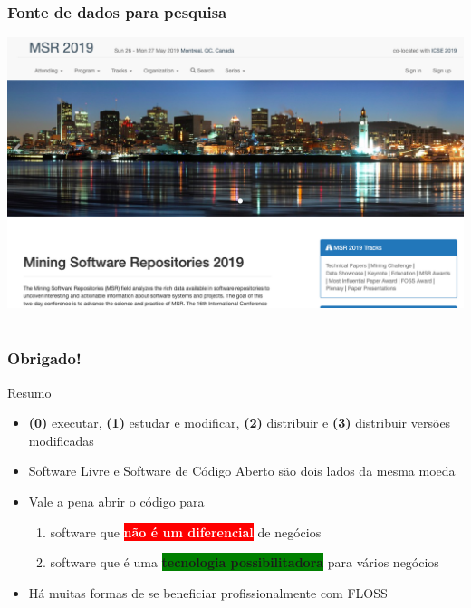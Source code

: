 \documentclass[xcolor=dvipsnames]{beamer}
\newcommand{\bred}[1]{\colorbox{red}{\textcolor{white}{#1}}}
\newcommand{\bgreen}[1]{\colorbox{green}{#1}}
\begin{document}
\begin{frame}
	\frametitle{Fonte de dados para pesquisa}
 	\includegraphics[scale=0.24]{msr.png}
\end{frame}


\section{}

\begin{frame}
	\frametitle{Obrigado!}
\begin{block}{Resumo}
\begin{itemize}
\item {\bf (0)} executar, {\bf (1)} estudar e modificar, {\bf (2)} distribuir e {\bf (3)} distribuir versões modificadas
\item Software Livre e Software de Código Aberto são dois lados da mesma moeda 
\item Vale a pena abrir o código para\vspace{0.1cm}
	\begin{enumerate}
	\item software que \bred{\textbf{não é um diferencial}} de negócios
	\item software que é uma \bgreen{\textbf{tecnologia possibilitadora}} para vários negócios
	\end{enumerate}
\item Há muitas formas de se beneficiar profissionalmente com FLOSS
\end{itemize}
\end{block}

\end{frame}
\end{document}
